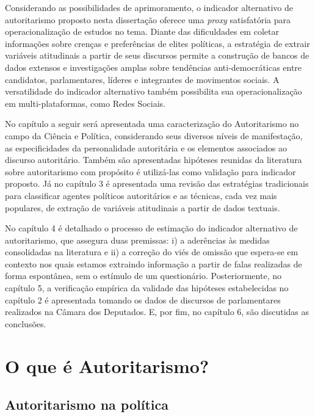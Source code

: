 \documentclass[
12pt,				%
openright,			%
twoside,			%
a4paper,			%
english,			%
french,				%
spanish,			%
brazil				%
]{abntex2}
\begin{document}
Considerando as possibilidades de aprimoramento, o indicador alternativo de autoritarismo proposto nesta dissertação oferece uma \emph{proxy} satisfatória para operacionalização de estudos no tema. Diante das dificuldades em coletar informações sobre crenças e preferências de elites políticas, a estratégia de extrair variáveis atitudinais a partir de seus discursos permite a construção de bancos de dados extensos e investigações amplas sobre tendências anti-democráticas entre candidatos, parlamentares, líderes e integrantes de movimentos sociais. A versatilidade do indicador alternativo também possibilita sua operacionalização em multi-plataformas, como Redes Sociais.

No capítulo a seguir será apresentada uma caracterização do Autoritarismo no campo da Ciência e Política, considerando seus diversos níveis de manifestação, as especificidades da personalidade autoritária e os elementos associados ao discurso autoritário. Também são apresentadas hipóteses reunidas da literatura sobre autoritarismo com propósito é utilizá-las como validação para indicador proposto. Já no capítulo 3 é apresentada uma revisão das estratégias tradicionais para classificar agentes políticos autoritários e as técnicas, cada vez mais populares, de extração de variáveis atitudinais a partir de dados textuais.

No capítulo 4 é detalhado o processo de estimação do indicador alternativo de autoritarismo, que assegura duas premissas: i) a aderências às medidas consolidadas na literatura e ii) a correção do viés de omissão que espera-se em contexto nos quais estamos extraindo informação a partir de falas realizadas de forma espontânea, sem o estímulo de um questionário. Posteriormente, no capítulo 5, a verificação empírica da validade das hipóteses estabelecidas no capítulo 2 é apresentada tomando os dados de discursos de parlamentares realizados na Câmara dos Deputados. E, por fim, no capítulo 6, são discutidas as conclusões.


\chapter{O que é Autoritarismo?}\label{referencial_teorico}

\section{Autoritarismo na política}
\end{document}
